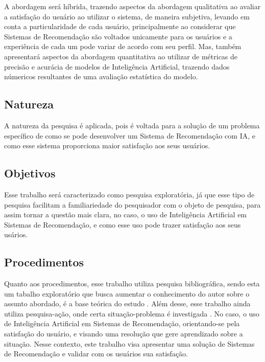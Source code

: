A abordagem será híbrida, trazendo aspectos da abordagem qualitativa ao avaliar a satisfação do usuário ao utilizar o sistema,
de maneira subjetiva, levando em conta a particularidade de cada usuário, principalmente ao considerar que Sistemas de Recomendação
são voltados unicamente para os usuários e a experiência de cada um pode variar de acordo com seu perfil. Mas, também apresentará
aspectos da abordagem quantitativa ao utilizar de métricas de precisão e acurácia de modelos de Inteligência Artificial, 
trazendo dados númericos resultantes de uma avaliação estatística do modelo.

\subsection{Natureza}\label{subsec:nat}

A natureza da pesquisa é aplicada, pois é voltada para a solução de um problema específico de como se pode desenvolver um Sistema
de Recomendação com IA, e como esse sistema proporciona maior satisfação aos seus usuários. 

\subsection{Objetivos}\label{subsec:obj}

Esse trabalho será caracterizado como pesquisa exploratória, já que esse tipo de pesquisa facilitam a familiariedade do pesquisador com o objeto de 
pesquisa, para assim tornar a questão mais clara, no caso, o uso de Inteligência Artificial em Sistemas de Recomendação, e como
esse uso pode trazer satisfação aos seus usários. 

\subsection{Procedimentos}\label{subsec:proced}

Quanto aos procedimentos, esse trabalho utiliza pesquisa bibliográfica, sendo esta um tabalho exploratório que busca
aumentar o conhecimento do autor sobre o assunto abordado, é a base teórica do estudo \cite{nascimento2016classificaccao}.
Além desse, esse trabalho ainda utiliza pesquisa-ação, onde certa situação-problema é investigada \cite{engel2000pesquisa}. 
No caso, o uso de Inteligência Artificial em Sistemas de Recomendação, orientando-se pela satisfação do usuário, 
e visando uma resolução que gere aprendizado sobre a situação. Nesse contexto, este trabalho visa apresentar 
uma solução de Sistemas de Recomendação e validar com os usuários sua satisfação.


